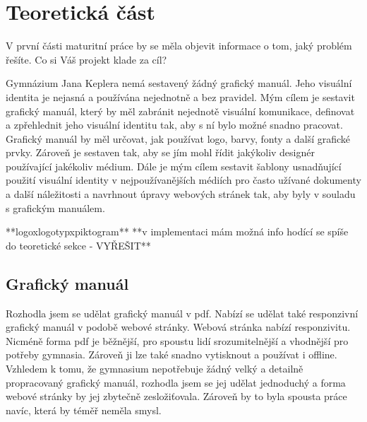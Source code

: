 \documentclass[11pt,a4paper,twoside,openright]{report}
\begin{document}


\setcounter{tocdepth}{2}
\tableofcontents

\chapter{Teoretická část}
\pagestyle{fancy}

V první části maturitní práce by se měla objevit informace o tom, jaký problém řešíte. Co si Váš projekt klade za cíl?

Gymnázium Jana Keplera nemá sestavený žádný grafický manuál. Jeho visuální identita je nejasná a používána nejednotně a bez pravidel. Mým cílem je sestavit grafický manuál, který by měl zabránit nejednotě visuální komunikace, definovat a zpřehlednit jeho visuální identitu tak, aby s ní bylo možné snadno pracovat. Grafický manuál by měl určovat, jak používat logo, barvy, fonty a další grafické prvky. Zároveň je sestaven tak, aby se jím mohl řídit jakýkoliv designér používající jakékoliv médium.
Dále je mým cílem sestavit šablony usnadňující použití visuální identity v nejpoužívanějších médiích pro často užívané dokumenty a další náležitosti a navrhnout úpravy webových stránek tak, aby byly v souladu s grafickým manuálem.

**logoxlogotypxpiktogram**
**v implementaci mám možná info hodící se spíše do teoretické sekce - VYŘEŠIT**

\section{Grafický manuál}
Rozhodla jsem se udělat grafický manuál v pdf. Nabízí se udělat také responzivní grafický manuál v podobě webové stránky. Webová stránka nabízí responzivitu. Nicméně forma pdf je běžnější, pro spoustu lidí srozumitelnější a vhodnější pro potřeby gymnasia. Zároveň ji lze také snadno vytisknout a používat i offline. Vzhledem k tomu, že gymnasium nepotřebuje žádný velký a detailně propracovaný grafický manuál, rozhodla jsem se jej udělat jednoduchý a forma webové stránky by jej zbytečně zesložiťovala. Zároveň by to byla spousta práce navíc, která by téměř neměla smysl.
\end{document}

